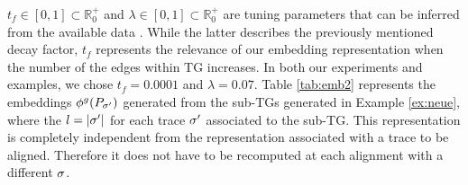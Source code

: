\begin{example} \small \label{ex:withpaths} %
$t_f\in [0,1]\subset\mathbb{R}^+_{0}$ and $\lambda\in [0,1]\subset\mathbb{R}^+_{0}$ are tuning parameters that can be inferred from the available data \cite{DriessensRG06}. While the latter describes the previously mentioned decay factor, $t_f$ represents the relevance of our embedding representation when the number of the edges within TG increases. In both our experiments and examples, we chose $t_f=0.0001$ and $\lambda=0.07$.
Table \ref{tab:emb2} represents the embeddings $\phi^{g}(P_{\sigma'})$ generated from the sub-TGs generated in Example \ref{ex:neue}, where the $l=|{\sigma'}|$ for each trace ${\sigma'}$ associated to the sub-TG. This representation is completely independent from the representation associated with a trace to be aligned. Therefore it does not have to be recomputed at each alignment with a different $\sigma$.

\end{example}
